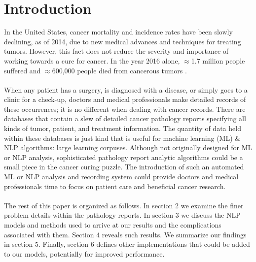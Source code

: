 \documentclass[twoside,twocolumn]{article}
\begin{document}
\section{Introduction}
In the United States, cancer mortality and incidence rates have been slowly declining, as of 2014, \cite{nci_2014} due to new medical advances and techniques for treating tumors. However, this fact does not reduce the severity and importance of working towards a cure for cancer. In the year 2016 alone, $\approx$1.7 million people suffered and $\approx$600,000 people died from cancerous tumors \cite{nci_2017}.\\
\\
When any patient has a surgery, is diagnosed with a disease, or simply goes to a clinic for a check-up, doctors and medical professionals make detailed records of these occurrences; it is no different when dealing with cancer records. There are databases that contain a slew of detailed cancer pathology reports specifying all kinds of tumor, patient, and treatment information. The quantity of data held within these databases is just kind that is useful for machine learning (ML) \& NLP algorithms: large learning corpuses. Although not originally designed for ML or NLP analysis, sophisticated pathology report analytic algorithms could be a small piece in the cancer curing puzzle. The introduction of such an automated ML or NLP analysis and recording system could provide doctors and medical professionals time to focus on patient care and beneficial cancer research.\\
\\
The rest of this paper is organized as follows. In section 2 we examine the finer problem details within the pathology reports. In section 3 we discuss the NLP models and methods used to arrive at our results and the complications associated with them. Section 4 reveals such results. We summarize our findings in section 5. Finally, section 6 defines other implementations that could be added to our models, potentially for improved performance.


\end{document}
